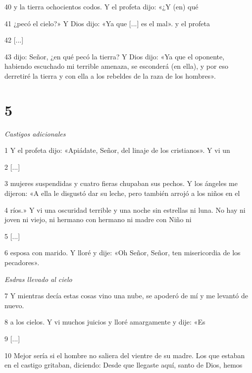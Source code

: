 \par 40 y la tierra ochocientos codos. Y el profeta dijo: «¿Y (en) qué

\par 41 ¿pecó el cielo?» Y Dios dijo: «Ya que [...] es el mal». y el profeta

\par 42 [...]

\par 43 dijo: Señor, ¿en qué pecó la tierra? Y Dios dijo: «Ya que el oponente, habiendo escuchado mi terrible amenaza, se esconderá (en ella), y por eso derretiré la tierra y con ella a los rebeldes de la raza de los hombres».

\chapter{5}

\par \textit{Castigos adicionales}

\par 1 Y el profeta dijo: «Apiádate, Señor, del linaje de los cristianos». Y vi un

\par 2 [...]

\par 3 mujeres suspendidas y cuatro fieras chupaban sus pechos. Y los ángeles me dijeron: «A ella le disgustó dar su leche, pero también arrojó a los niños en el

\par 4 ríos.» Y vi una oscuridad terrible y una noche sin estrellas ni luna. No hay ni joven ni viejo, ni hermano con hermano ni madre con Niño ni

\par 5 [...]

\par 6 esposa con marido. Y lloré y dije: «Oh Señor, Señor, ten misericordia de los pecadores».

\par \textit{Esdras llevado al cielo}

\par 7 Y mientras decía estas cosas vino una nube, se apoderó de mí y me levantó de nuevo.

\par 8 a los cielos. Y vi muchos juicios y lloré amargamente y dije: «Es

\par 9 [...]

\par 10 Mejor sería si el hombre no saliera del vientre de su madre. Los que estaban en el castigo gritaban, diciendo: Desde que llegaste aquí, santo de Dios, hemos

